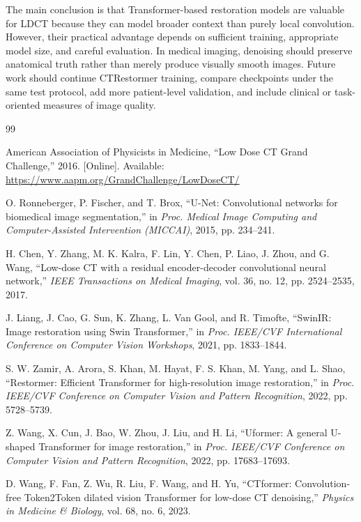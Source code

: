 \documentclass[journal]{IEEEtran}
\begin{document}
The main conclusion is that Transformer-based restoration models are valuable for LDCT because they can model broader context than purely local convolution. However, their practical advantage depends on sufficient training, appropriate model size, and careful evaluation. In medical imaging, denoising should preserve anatomical truth rather than merely produce visually smooth images. Future work should continue CTRestormer training, compare checkpoints under the same test protocol, add more patient-level validation, and include clinical or task-oriented measures of image quality.

\begin{thebibliography}{99}

American Association of Physicists in Medicine, ``Low Dose CT Grand Challenge,'' 2016. [Online]. Available: \url{https://www.aapm.org/GrandChallenge/LowDoseCT/}

O. Ronneberger, P. Fischer, and T. Brox, ``U-Net: Convolutional networks for biomedical image segmentation,'' in \emph{Proc. Medical Image Computing and Computer-Assisted Intervention (MICCAI)}, 2015, pp. 234--241.

H. Chen, Y. Zhang, M. K. Kalra, F. Lin, Y. Chen, P. Liao, J. Zhou, and G. Wang, ``Low-dose CT with a residual encoder-decoder convolutional neural network,'' \emph{IEEE Transactions on Medical Imaging}, vol. 36, no. 12, pp. 2524--2535, 2017.

J. Liang, J. Cao, G. Sun, K. Zhang, L. Van Gool, and R. Timofte, ``SwinIR: Image restoration using Swin Transformer,'' in \emph{Proc. IEEE/CVF International Conference on Computer Vision Workshops}, 2021, pp. 1833--1844.

S. W. Zamir, A. Arora, S. Khan, M. Hayat, F. S. Khan, M. Yang, and L. Shao, ``Restormer: Efficient Transformer for high-resolution image restoration,'' in \emph{Proc. IEEE/CVF Conference on Computer Vision and Pattern Recognition}, 2022, pp. 5728--5739.

Z. Wang, X. Cun, J. Bao, W. Zhou, J. Liu, and H. Li, ``Uformer: A general U-shaped Transformer for image restoration,'' in \emph{Proc. IEEE/CVF Conference on Computer Vision and Pattern Recognition}, 2022, pp. 17683--17693.

D. Wang, F. Fan, Z. Wu, R. Liu, F. Wang, and H. Yu, ``CTformer: Convolution-free Token2Token dilated vision Transformer for low-dose CT denoising,'' \emph{Physics in Medicine \& Biology}, vol. 68, no. 6, 2023.

\end{thebibliography}
\end{document}
